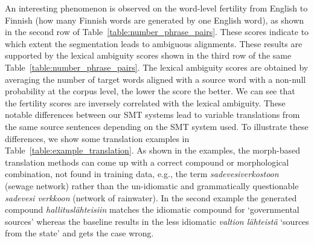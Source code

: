 \documentclass[free]{flammie}
\begin{document}
An interesting phenomenon is observed on the word-level fertility from English to Finnish (how many Finnish words are generated by one English word), as shown in the second row of Table~\ref{table:number_phrase_pairs}.
These scores indicate to which extent the segmentation leads to ambiguous alignments.
These results are supported by the lexical ambiguity scores shown in the third row of the same Table~\ref{table:number_phrase_pairs}.
The lexical ambiguity scores are obtained by averaging the number of target words aligned with a source word with a non-null probability at the corpus level, the lower the score the better.
We can see that the fertility scores are inversely correlated with the lexical ambiguity.
These notable differences between our SMT systems lead to variable translations from the same source sentences depending on the SMT system used. To illustrate these differences, we show some translation examples in Table~\ref{table:example_translation}.
As shown in the examples, the morph-based translation methods can come up with a correct compound or morphological combination, not found in training data, e.g., the term \textit{sadevesiverkostoon} (sewage network) rather than the un-idiomatic and grammatically questionable \textit{sadevesi verkkoon} (network of rainwater). In the second example the generated compound \textit{hallituslähteisiin} matches the idiomatic compound for `governmental sources' whereas the baseline results in the less idiomatic \textit{valtion lähteistä} `sources from the state' and gets the case wrong.

\begin{table}
\end{table}
\end{document}
